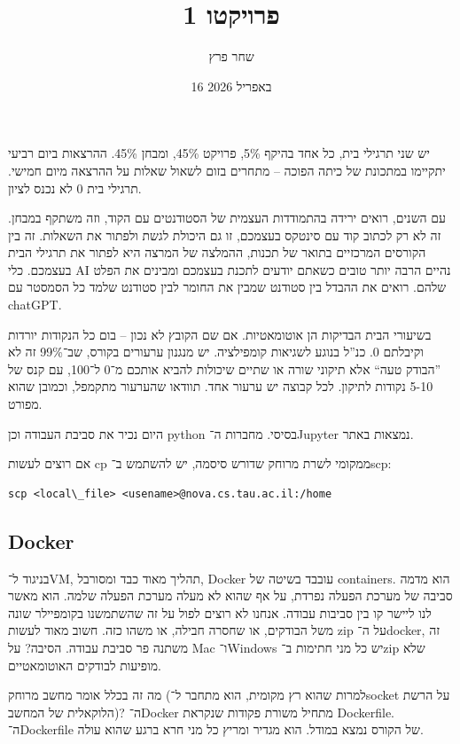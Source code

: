 \documentclass[]{../../tex/classes/styledArticle}
\author{שחר פרץ}
\title{פרויקטו 1}
\date{16 באפריל 2026}
\begin{document}
	\maketitle
	יש שני תרגילי בית, כל אחד בהיקף 5\%, פרויקט 45\%, ומבחן 45\%. ההרצאות ביום רביעי יתקיימו במתכונת של כיתה הפוכה – מתחרים בזום לשאול שאלות על ההרצאה מיום חמישי. תרגילי בית 0 לא נכנס לציון. 
	
	עם השנים, רואים ירידה בהתמודדות העצמית של הסטודנטים עם הקוד, וזה משתקף במבחן. זה לא רק לכתוב קוד עם סינטקס בעצמכם, זו גם היכולת לגשת ולפתור את השאלות. זה בין הקורסים המרכזיים בתואר של תכנות, ההמלצה של המרצה היא לפתור את תרגילי הבית בעצמכם. כלי AI נהיים הרבה יותר טובים כשאתם יודעים לתכנת בעצמכם ומבינים את הפלט שלהם. רואים את ההבדל בין סטודנט שמבין את החומר לבין סטודנט שלמד כל הסמסטר עם chatGPT. 
	
	בשיעורי הבית הבדיקות הן אוטומאטיות. אם שם הקובץ לא נכון – בום כל הנקודות יורדות וקיבלתם 0. כנ''ל בנוגע לשגיאות קומפילציה. יש מנגנון ערעורים בקורס, שב־99\% זה לא ''הבודק טעה`` אלא תיקוני שורה או שתיים שיכולות להביא אותכם מ־0 ל־100, עם קנס של 5-10 נקודות לתיקון. לכל קבוצה יש ערעור אחד. תוודאו שהערעור מתקמפל, וכמובן שהוא מפורט. 
	
	היום נכיר את סביבת העבודה וכן python בסיסי. מחברות ה־Jupyter נמצאות באתר. 
	
	אם רוצים לעשות cp ממקומי לשרת מרוחק שדורש סיסמה, יש להשתמש ב־scp: 
	
	
	\sen\begin{lstlisting}
scp <local\_file> <usename>@nova.cs.tau.ac.il:/home
	\end{lstlisting}\she
	
	\sen
	\subsection*{Docker}
	\she
	
	בניגוד ל־VM, תהליך מאוד כבד  ומסורבל, Docker עובבד בשיטה של containers. הוא מדמה סביבה של מערכת הפעלה נפרדת, על אף שהוא לא מעלה מערכת הפעלה שלמה. הוא מאשר לנו ליישר קו בין סביבות עבודה. אנחנו לא רוצים לפול על זה שהשתמשנו בקומפיילר שונה משל הבודקים, או שחסרה חבילה, או משהו כזה. חשוב מאוד לעשות zip על ה־docker, זה משתנה פר סביבת עבודה. הסיבה? על Mac ו־Windows יש כל מני חתימות ב־zip שלא מופיעות לבודקים האוטומאטיים. 
	
	מה זה בכלל אומר מחשב מרוחק (למרות שהוא רץ מקומית, הוא מתחבר ל־socket על הרשת הלוקאלית של המחשב)? ה־Docker מתחיל משורת פקודות שנקראת Dockerfile. ה־Dockerfile של הקורס נמצא במודל. הוא מגדיר ומריץ כל מני חרא ברגע שהוא עולה. 
	
\end{document}
